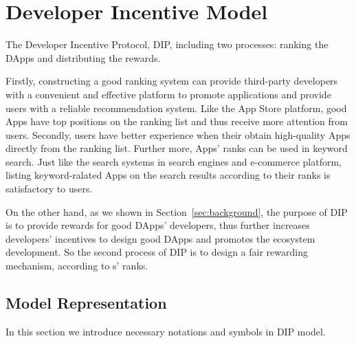 \section{Developer Incentive Model}
The Developer Incentive Protocol, DIP, including two processes: ranking the DApps and distributing the rewards.

Firstly, constructing a good ranking system can provide third-party developers with a convenient and effective platform to promote applications and provide users with a reliable recommendation system. Like the App Store platform, good Apps have top positions on the ranking list and thus receive more attention from users. Secondly, users have better experience when their obtain high-quality Apps directly from the ranking list. Further more, Apps' ranks can be used in keyword search. Just like the search systems in search engines and e-commerce platform,  listing keyword-ralated Apps on the search results according to their ranks is satisfactory to users.

On the other hand, as we shown in Section~\ref{sec:background}, the purpose of DIP is to provide rewards for good DApps' developers, thus further increases developers' incentives to design good DApps and promotes the ecosystem development. So the second process of DIP is to design a fair rewarding mechanism, according to {\dapp}s' ranks.

\subsection{Model Representation}
\label{subsection:parameters}
In this section we introduce necessary notations and symbols in DIP model.


